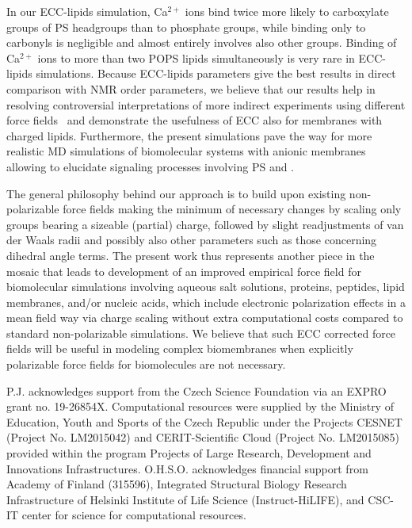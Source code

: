 \documentclass[journal=jctcce,manuscript=article]{achemso}
\begin{document}
In our ECC-lipids simulation, Ca$^{2+}$ ions bind twice more likely to carboxylate groups
of PS headgroups than to phosphate groups, 
while binding only to carbonyls is negligible and almost entirely involves also other groups. 
Binding of Ca$^{2+}$ ions to more than two POPS lipids simultaneously is very rare in \mbox{ECC-lipids} simulations.
Because \mbox{ECC-lipids} parameters give the best results in direct comparison with NMR order parameters, 
we believe that our results help in resolving controversial interpretations of more indirect experiments
using different force fields~\cite{melcrova16,valentine18,hallock18}
and demonstrate the usefulness of ECC also for membranes with charged lipids.
Furthermore, the present simulations pave the way
for more realistic MD simulations of biomolecular systems with anionic membranes
allowing to elucidate signaling processes involving PS and . 


The general philosophy behind our approach is to build upon existing non-polarizable force fields making the minimum of necessary changes by scaling only groups bearing a sizeable (partial) charge, followed by slight readjustments of van der Waals radii and possibly also other parameters such as those concerning dihedral angle terms.
The present work thus represents another piece in the mosaic that leads to development of an improved empirical force field for biomolecular simulations involving aqueous salt solutions, proteins, peptides, lipid membranes, and/or nucleic acids, which include electronic polarization effects in a mean field way via charge scaling without extra computational costs compared to standard non-polarizable simulations. 
We believe that such ECC corrected force fields will be useful in modeling complex biomembranes when 
explicitly polarizable force fields for biomolecules \cite{amoeba13,li17,chu18} are not necessary.

\begin{acknowledgement} 
P.J. acknowledges support from the Czech Science Foundation via an EXPRO grant no. 19-26854X. 
Computational resources were supplied by the Ministry of Education, Youth and Sports 
of the Czech Republic under the Projects CESNET (Project No. LM2015042) and CERIT-Scientific 
Cloud (Project No. LM2015085) provided within the program Projects of Large Research, 
Development and Innovations Infrastructures. 
O.H.S.O. acknowledges financial support from Academy of Finland (315596),
Integrated Structural Biology Research Infrastructure of
Helsinki Institute of Life Science (Instruct-HiLIFE), and
CSC-IT center for science for computational resources.
\end{acknowledgement} 
 
\end{document}
